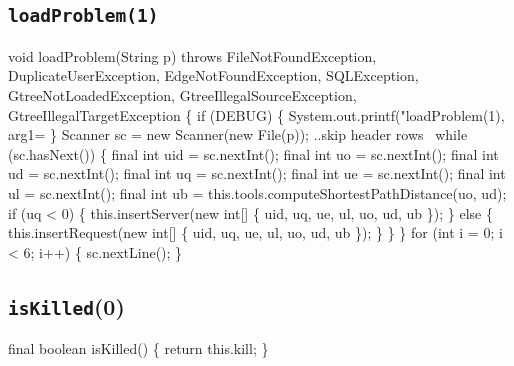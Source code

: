 \subsection{\texttt{loadProblem(1)}}
\nwenddocs{}\endmoddef{}
void loadProblem(String p)
throws FileNotFoundException, DuplicateUserException, EdgeNotFoundException, SQLException,
       GtreeNotLoadedException, GtreeIllegalSourceException, GtreeIllegalTargetException \{
  if (DEBUG) \{
    System.out.printf("loadProblem(1), arg1=%
  \}
  Scanner sc = new Scanner(new File(p));
  \LA{}..skip header rows~{\nwtagstyle{}}\RA{}
  while (sc.hasNext()) \{
    final int uid = sc.nextInt();
    final int  uo = sc.nextInt();
    final int  ud = sc.nextInt();
    final int  uq = sc.nextInt();
    final int  ue = sc.nextInt();
    final int  ul = sc.nextInt();
    final int  ub = this.tools.computeShortestPathDistance(uo, ud);
    if (uq < 0) \{
      this.insertServer(new int[] \{ uid, uq, ue, ul, uo, ud, ub \});
    \} else \{
      this.insertRequest(new int[] \{ uid, uq, ue, ul, uo, ud, ub \});
    \}
  \}
\}
\eatline
{}\nwendcode{}\endmoddef{}
for (int i = 0; i < 6; i++) \{
  sc.nextLine();
\}
\nwendcode{}\nwdocspar

\subsection{\texttt{isKilled}(0)}
\nwenddocs{}\endmoddef{}
final boolean isKilled() \{
  return this.kill;
\}
\eatline
{}\nwendcode{}\nwdocspar
